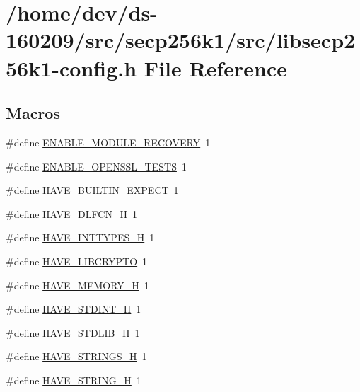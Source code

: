 \hypertarget{libsecp256k1-config_8h}{}\section{/home/dev/ds-\/160209/src/secp256k1/src/libsecp256k1-\/config.h File Reference}
\label{libsecp256k1-config_8h}
\subsection*{Macros}
\begin{DoxyCompactItemize}
\item 
\#define \hyperlink{libsecp256k1-config_8h_aabee9d96497d59be9118603daa72938c}{E\+N\+A\+B\+L\+E\+\_\+\+M\+O\+D\+U\+L\+E\+\_\+\+R\+E\+C\+O\+V\+E\+R\+Y}~1
\item 
\#define \hyperlink{libsecp256k1-config_8h_a67f8dc42c97a3615c4ab50719092e308}{E\+N\+A\+B\+L\+E\+\_\+\+O\+P\+E\+N\+S\+S\+L\+\_\+\+T\+E\+S\+T\+S}~1
\item 
\#define \hyperlink{libsecp256k1-config_8h_aa5bab8dff3e45fd5496e24c6eac6b808}{H\+A\+V\+E\+\_\+\+B\+U\+I\+L\+T\+I\+N\+\_\+\+E\+X\+P\+E\+C\+T}~1
\item 
\#define \hyperlink{libsecp256k1-config_8h_a0ee1617ff2f6885ef384a3dd46f9b9d7}{H\+A\+V\+E\+\_\+\+D\+L\+F\+C\+N\+\_\+\+H}~1
\item 
\#define \hyperlink{libsecp256k1-config_8h_ab90a030ff2790ebdc176660a6dd2a478}{H\+A\+V\+E\+\_\+\+I\+N\+T\+T\+Y\+P\+E\+S\+\_\+\+H}~1
\item 
\#define \hyperlink{libsecp256k1-config_8h_a07ee8e997f10608515351bf1649f8e31}{H\+A\+V\+E\+\_\+\+L\+I\+B\+C\+R\+Y\+P\+T\+O}~1
\item 
\#define \hyperlink{libsecp256k1-config_8h_ae93a78f9d076138897af441c9f86f285}{H\+A\+V\+E\+\_\+\+M\+E\+M\+O\+R\+Y\+\_\+\+H}~1
\item 
\#define \hyperlink{libsecp256k1-config_8h_ab6cd6d1c63c1e26ea2d4537b77148354}{H\+A\+V\+E\+\_\+\+S\+T\+D\+I\+N\+T\+\_\+\+H}~1
\item 
\#define \hyperlink{libsecp256k1-config_8h_a9e0e434ec1a6ddbd97db12b5a32905e0}{H\+A\+V\+E\+\_\+\+S\+T\+D\+L\+I\+B\+\_\+\+H}~1
\item 
\#define \hyperlink{libsecp256k1-config_8h_a405d10d46190bcb0320524c54eafc850}{H\+A\+V\+E\+\_\+\+S\+T\+R\+I\+N\+G\+S\+\_\+\+H}~1
\item 
\#define \hyperlink{libsecp256k1-config_8h_ad4c234dd1625255dc626a15886306e7d}{H\+A\+V\+E\+\_\+\+S\+T\+R\+I\+N\+G\+\_\+\+H}~1

\end{DoxyCompactItemize}
